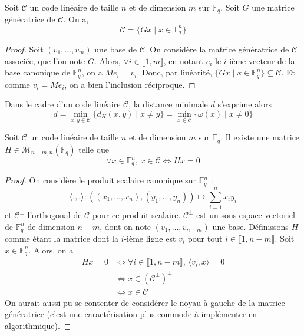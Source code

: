   \begin{proposition}
    Soit $\mathcal{C}$ un code linéaire de taille $n$ et de dimension $m$ sur $\mathbb{F}_q$. Soit $G$ une matrice génératrice de $\mathcal{C}$. On a,
    \[ \mathcal{C} = \{ Gx \mid x \in \mathbb{F}_q^n \} \]
  \end{proposition}

  \begin{proof}
    Soit $(v_1, \dots, v_m)$ une base de $\mathcal{C}$. On considère la matrice génératrice de $\mathcal{C}$ associée, que l'on note $G$.
    \newpar
    Alors, $\forall i \in \llbracket 1, m \rrbracket$, en notant $e_i$ le $i$-ième vecteur de la base canonique de $\mathbb{F}_q^n$, on a $Me_i = v_i$. Donc, par linéarité, $\{ Gx \mid x \in \mathbb{F}_q^n \} \subseteq \mathcal{C}$.
    Et comme $v_i = Me_i$, on a bien l'inclusion réciproque.
  \end{proof}

  \begin{remark}
    Dans le cadre d'un code linéaire $\mathcal{C}$, la distance minimale $d$ s'exprime alors
    \[ d = \min_{x,y \in \mathcal{C}} \{ d_H(x,y) \mid x \neq y \} = \min_{x \in \mathcal{C}} \{ \omega(x) \mid x \neq 0 \} \]
  \end{remark}

  \begin{proposition}
    Soit $\mathcal{C}$ un code linéaire de taille $n$ et de dimension $m$ sur $\mathbb{F}_q$. Il existe une matrice $H \in \mathcal{M}_{n-m,n}(\mathbb{F}_q)$ telle que
    \[ \forall x \in \mathbb{F}_q^n, \, x \in \mathcal{C} \iff Hx = 0 \]
  \end{proposition}

  \begin{proof}
    On considère le produit scalaire canonique sur $\mathbb{F}_q^n$ :
    \[ \langle ., . \rangle : ((x_1, \dots, x_n), (y_1, \dots, y_n)) \mapsto \sum_{i=1}^n x_iy_i \]
    et $\mathcal{C}^\perp$ l'orthogonal de $\mathcal{C}$ pour ce produit scalaire. $\mathcal{C}^\perp$ est un sous-espace vectoriel de $\mathbb{F}_q^n$ de dimension $n-m$, dont on note $(v_1, \dots, v_{n-m})$ une base. Définissons $H$ comme étant la matrice dont la $i$-ième ligne est $v_i$ pour tout $i \in \llbracket 1, n-m \rrbracket$.  Soit $x \in \mathbb{F}_q^n$. Alors, on a
    \begin{align*}
      Hx = 0 &\iff \forall i \in \llbracket 1, n-m \rrbracket, \, \langle v_i, x \rangle = 0 \\
      &\iff x \in (\mathcal{C}^\perp)^\perp \\
      &\iff x \in \mathcal{C}
    \end{align*}
    On aurait aussi pu se contenter de considérer le noyau à gauche de la matrice génératrice (c'est une caractérisation plus commode à implémenter en algorithmique).
  \end{proof}

